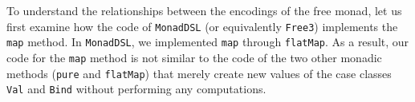 To understand the relationships between the encodings of the free
monad, let us first examine how the code of \lstinline!MonadDSL!
(or equivalently \lstinline!Free3!)
implements the \lstinline!map!
method. In \lstinline!MonadDSL!,
we implemented \lstinline!map!
through \lstinline!flatMap!.
As a result, our code for the \lstinline!map!
method is not similar to the code of the two other monadic methods
(\lstinline!pure! and \lstinline!flatMap!)
that merely create new values of the case classes \lstinline!Val!
and \lstinline!Bind! without
performing any computations.

